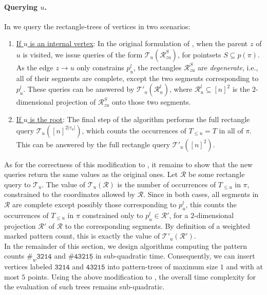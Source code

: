 \documentclass{article}
\newcommand{\pce}[1]{{\# \mathtt{#1} }}
\newcommand{\pcwe}[1]{{\#_w \mathtt{ #1 } }}
\theoremstyle{remark}
\theoremstyle{plain}
\begin{document}
\paragraph{Querying $u$.} In  we query the rectangle-trees of vertices 
in two scenarios:
\begin{enumerate}
    \item \underline{If $u$ is an internal vertex}: In the original formulation of ,
    when the parent $z$ of $u$ is visited, we issue queries of the form $\mathcal{T}_u(\mathcal{R}^S_{zu})$,
    for pointsets $S \subseteq p(\pi)$. As the edge $z \to u$ only constrains $p_u^l$, the
    rectangles $\mathcal{R}^S_{zu}$ are \textit{degenerate}, i.e., all of their segments are complete, except
    the two segments corresponding to $p_u^l$.
    These queries can be answered by $\mathcal{T}'_u(\mathcal{R}_u^l)$, where $\mathcal{R}_u^l \subseteq [n]^2$ is the
    $2$-dimensional projection of $\mathcal{R}_{zu}^S$ onto those two segments.
    \item \underline{If $u$ is the root}: The final step of the algorithm performs the full rectangle query $\mathcal{T}_u ([n]^{2|\tau_u|})$, which counts the occurrences of $T_{\le u}=T$ in all of $\pi$. This can be answered by the full rectangle query $\mathcal{T}'_u ([n]^2)$. 
\end{enumerate}

As for the correctness of this modification to , it remains to show that the new queries return the same values as the original ones. Let $\mathcal{R}$ be some rectangle query to $\mathcal{T}_u$. The value of $\mathcal{T}_u(\mathcal{R})$ is the number of occurrences of $T_{\le u}$ in $\pi$, constrained to the coordinates allowed by $\mathcal{R}$. Since in both cases, all segments in $\mathcal{R}$ are complete except possibly those corresponding to $p_u^l$, this counts the occurrences of $T_{\le u}$ in $\pi$ constrained only to $p_u^l\in\mathcal{R}'$, for a $2$-dimensional projection $\mathcal{R}'$ of $\mathcal{R}$ to the corresponding segments. By definition of a weighted marked pattern count, this is exactly the value of $\mathcal{T}'_u(\mathcal{R}')$. \\

In the remainder of this section,
we design algorithms computing the pattern counts $\pcwe{321\underline{4}}$ and $\pce{4321\underline{5}}$ in sub-quadratic time.
Consequently, we can insert vertices labeled $\mathtt{3214}$ and $\mathtt{43215}$ into pattern-trees of maximum size $1$ and
with at most $5$ points.
Using the above modification to , the overall time complexity for the 
evaluation of such trees remains sub-quadratic.
\end{document}
